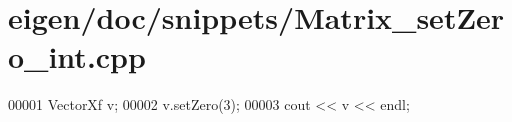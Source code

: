 \hypertarget{eigen_2doc_2snippets_2_matrix__set_zero__int_8cpp_source}{}\section{eigen/doc/snippets/\+Matrix\+\_\+set\+Zero\+\_\+int.cpp}
\label{eigen_2doc_2snippets_2_matrix__set_zero__int_8cpp_source}

\begin{DoxyCode}
00001 VectorXf v;
00002 v.setZero(3);
00003 cout << v << endl;
\end{DoxyCode}
